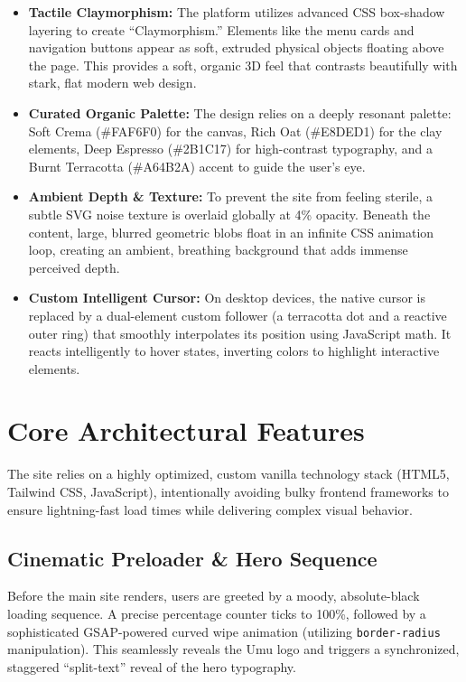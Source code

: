 \documentclass[11pt, a4paper]{article}
\begin{document}
\begin{itemize}[label=\textcolor{umuaccent}{\textbullet}]
    \item \textbf{Tactile Claymorphism:} The platform utilizes advanced CSS box-shadow layering to create ``Claymorphism.'' Elements like the menu cards and navigation buttons appear as soft, extruded physical objects floating above the page. This provides a soft, organic 3D feel that contrasts beautifully with stark, flat modern web design.
    \item \textbf{Curated Organic Palette:} The design relies on a deeply resonant palette: Soft Crema (\#FAF6F0) for the canvas, Rich Oat (\#E8DED1) for the clay elements, Deep Espresso (\#2B1C17) for high-contrast typography, and a Burnt Terracotta (\#A64B2A) accent to guide the user's eye.
    \item \textbf{Ambient Depth \& Texture:} To prevent the site from feeling sterile, a subtle SVG noise texture is overlaid globally at 4\% opacity. Beneath the content, large, blurred geometric blobs float in an infinite CSS animation loop, creating an ambient, breathing background that adds immense perceived depth.
    \item \textbf{Custom Intelligent Cursor:} On desktop devices, the native cursor is replaced by a dual-element custom follower (a terracotta dot and a reactive outer ring) that smoothly interpolates its position using JavaScript math. It reacts intelligently to hover states, inverting colors to highlight interactive elements.
\end{itemize}

\section{Core Architectural Features}
The site relies on a highly optimized, custom vanilla technology stack (HTML5, Tailwind CSS, JavaScript), intentionally avoiding bulky frontend frameworks to ensure lightning-fast load times while delivering complex visual behavior.

\subsection{Cinematic Preloader \& Hero Sequence}
Before the main site renders, users are greeted by a moody, absolute-black loading sequence. A precise percentage counter ticks to 100\%, followed by a sophisticated GSAP-powered curved wipe animation (utilizing \texttt{border-radius} manipulation). This seamlessly reveals the Umu logo and triggers a synchronized, staggered ``split-text'' reveal of the hero typography.
\end{document}
